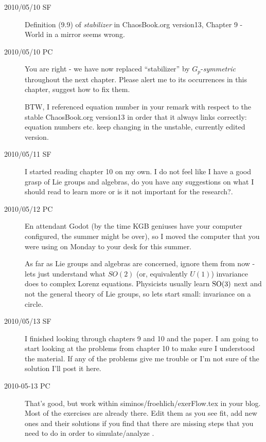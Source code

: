 \begin{description}
\item[2010/05/10 SF] Definition (9.9) of \emph{stabilizer}
in ChaosBook.org version13, 
{Chapter 9 - World in a mirror} seems wrong.

\item[2010/05/10 PC] You are right - we have now
{replaced ``stabilizer''} by $G_p$-\emph{symmetric} throughout the next chapter.
Please alert me to its occurrences in this chapter, suggest how to
fix them.

BTW, I referenced equation number in your remark with respect to
the stable ChaosBook.org version13 in order that it always links
 correctly: equation numbers etc. keep changing in the unstable,
 currently edited version.


\item[2010/05/11 SF] I started reading chapter 10 on my own.
I do not feel like I have a good grasp of Lie groups and algebras,
do you have any suggestions on what I should read to learn more
or is it not important for the research?.

\item[2010/05/12 PC] En attendant Godot (by the time KGB geniuses have
 your computer configured, the summer might be over), so I moved the
 computer that you were using on Monday to your desk for this summer.

As far as Lie groups and algebras are concerned, ignore them from now - lets just understand what $SO(2)$ (or, equivalently $U(1)$) invariance does to complex Lorenz equations. Physicists usually learn $\textrm{SO}(3)$ next and not the general theory of Lie groups, so lets start small: invariance on a circle.

\item[2010/05/13 SF] I finished looking through chapters 9 and 10 and the paper. I am going to start looking at the problems from chapter 10 to make sure I understood the material. If any of the problems give me trouble or I'm not sure of the solution I'll post it here.

\item[2010-05-13 PC] That's good, but work within
siminos/froehlich/exerFlow.tex in your blog. Most of the exercises are
already there. Edit them as you see fit, add new ones and their solutions
 if you find that there are missing steps that you need to do in order
to simulate/analyze \cLe.


\end{description}
